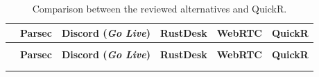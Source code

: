 \documentclass{article}
\begin{document}
   \begingroup
    \footnotesize
    \renewcommand{\arraystretch}{1.3} 
    \setlength{\tabcolsep}{4pt}
        \begin{xltabular}{\textwidth}{|>{\raggedright\arraybackslash\bfseries}p{2.4cm}|Y|Y|Y|Y|Y|}
            \caption{Comparison between the reviewed alternatives and QuickR.}
            \label{tab:comparison}\\
            \hline
            & \textbf{Parsec} & \textbf{Discord (\textit{Go Live})} & \textbf{RustDesk} & \textbf{WebRTC} & \textbf{QuickR} \\
            \hline
            \endfirsthead
             \\
            \hline
            & \textbf{Parsec} & \textbf{Discord (\textit{Go Live})} & \textbf{RustDesk} & \textbf{WebRTC} & \textbf{QuickR} \\
            \hline
            \endhead
             \\
            \endfoot
            \endlastfoot


\end{xltabular}
\end{document}
